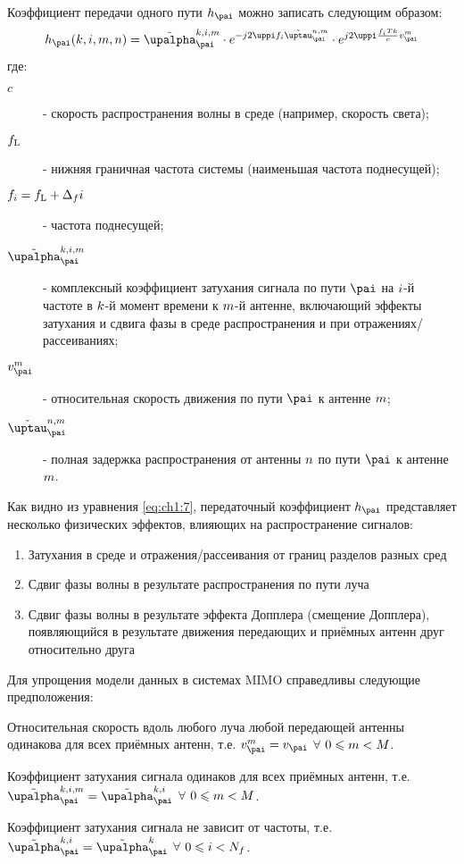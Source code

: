 Коэффициент передачи одного пути $\hpa$ можно записать следующим образом:
\begin{equation}
\label{eq:ch1:7}
\hpa(\ti,\fri,\rxi,\txi) = \tgaini^{\ti,\fri,\rxi} \cdot 
                           e^{-j2\pi \sfr \fulldelay} \cdot 
                           e^{j2\pi \frac{\sfr \ts\ti}{c} \vrel^\rxi}
\end{equation}
где:
\begin{description}
	\item[$c$] - скорость распространения волны в среде (например, скорость света);
	\item[$f_{\mathrm{L}}$] - нижняя граничная частота системы (наименьшая частота поднесущей);
	\item[$f_i=f_{\mathrm{L}} + \Delta_f i$] - частота поднесущей;
	\item[$\tgaini^{\ti,\fri,\rxi}$] - комплексный коэффициент затухания сигнала по пути $\pai$ на $i$-й частоте в $k$-й момент времени к ${m}$-й антенне, включающий эффекты затухания и сдвига фазы в среде распространения и при отражениях/рассеиваниях;
	\item[$\vrel^\rxi$] - относительная скорость движения по пути $\pai$ к антенне ${m}$;
	\item[$\fulldelay$] - полная задержка распространения от антенны ${n}$ по пути $\pai$ к антенне ${m}$.
\end{description}

Как видно из уравнения \eqref{eq:ch1:7}, передаточный коэффициент $h_\pai$ представляет несколько физических эффектов, влияющих на распространение сигналов:
\begin{enumerate}
	\item Затухания в среде и отражения/рассеивания от границ разделов разных сред
	\item Сдвиг фазы волны в результате распространения по пути луча
	\item Сдвиг фазы волны в результате эффекта Допплера (смещение Допплера), появляющийся в результате движения передающих и приёмных антенн друг относительно друга
\end{enumerate}

Для упрощения модели данных в системах MIMO справедливы следующие предположения:
\begin{assumption}
	\label{as:ch1:2}
	Относительная скорость вдоль любого луча любой передающей антенны одинакова для всех приёмных антенн, т.е. $\vrel^\rxi=\vrel$ $\forall$ $0\leqslant{m}<{M}$.
\end{assumption}
\begin{assumption}
\label{as:ch1:3}
Коэффициент затухания сигнала одинаков для всех приёмных антенн, т.е. $\tgaini^{\ti,\fri,\rxi}=\tgaini^{\ti,\fri}$ $\forall$ $0\leqslant{m}<{M}$.
\end{assumption}
\begin{assumption}
	\label{as:ch1:4}
	Коэффициент затухания сигнала не зависит от частоты, т.е. $\tgaini^{\ti,\fri}=\tgaini^{\ti}$ $\forall$ $0\leqslant i<N_f$.
\end{assumption}

